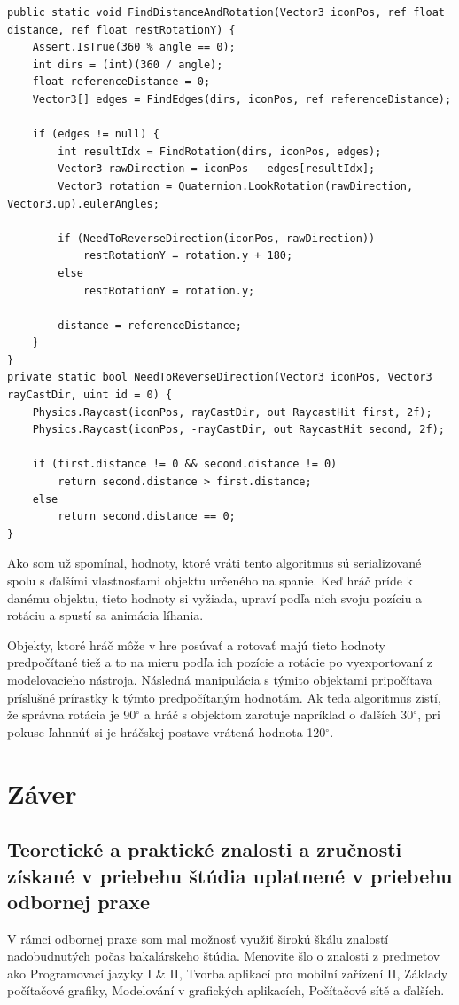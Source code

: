 \documentclass[slovak, bachelorpractice]{diploma}
\begin{document}
\vspace{10pt}
\begin{lstlisting}[label=src:entry,caption={Vstupný bod algoritmu na získanie rozácie a pozície postavy pri ležaní}]
public static void FindDistanceAndRotation(Vector3 iconPos, ref float distance, ref float restRotationY) {
    Assert.IsTrue(360 % angle == 0);
    int dirs = (int)(360 / angle);
    float referenceDistance = 0;
    Vector3[] edges = FindEdges(dirs, iconPos, ref referenceDistance);

    if (edges != null) {
        int resultIdx = FindRotation(dirs, iconPos, edges);
        Vector3 rawDirection = iconPos - edges[resultIdx];
        Vector3 rotation = Quaternion.LookRotation(rawDirection, Vector3.up).eulerAngles;

        if (NeedToReverseDirection(iconPos, rawDirection))
            restRotationY = rotation.y + 180;
        else
            restRotationY = rotation.y;

        distance = referenceDistance;
    }
}
private static bool NeedToReverseDirection(Vector3 iconPos, Vector3 rayCastDir, uint id = 0) {
    Physics.Raycast(iconPos, rayCastDir, out RaycastHit first, 2f);
    Physics.Raycast(iconPos, -rayCastDir, out RaycastHit second, 2f);

    if (first.distance != 0 && second.distance != 0)
        return second.distance > first.distance;
    else
        return second.distance == 0;
}
\end{lstlisting}

Ako som už spomínal, hodnoty, ktoré vráti tento algoritmus sú serializované spolu s ďalšími vlastnosťami objektu určeného na spanie. Keď hráč príde k danému objektu, tieto hodnoty si vyžiada, upraví podľa nich svoju pozíciu a rotáciu a spustí sa animácia líhania.

Objekty, ktoré hráč môže v hre posúvať a rotovať majú tieto hodnoty predpočítané tiež a to na mieru podľa ich pozície a rotácie po vyexportovaní z modelovacieho nástroja. Následná manipulácia s týmito objektami pripočítava príslušné prírastky k týmto predpočítaným hodnotám. Ak teda algoritmus zistí, že správna rotácia je 90$^{\circ}$ a hráč s objektom zarotuje napríklad o ďalších 30$^{\circ}$, pri pokuse ľahnnúť si je hráčskej postave vrátená hodnota 120$^{\circ}$.

\chapter{Záver}
\section{Teoretické a praktické znalosti a zručnosti získané v priebehu štúdia uplatnené v priebehu odbornej praxe}
V rámci odbornej praxe som mal možnosť využiť širokú škálu znalostí nadobudnutých počas bakalárskeho štúdia. Menovite šlo o znalosti z predmetov ako Programovací jazyky I \& II, Tvorba aplikací pro mobilní zařízení II, Základy počítačové grafiky, Modelování v grafických aplikacích, Počítačové sítě a ďalších. 
\end{document}
